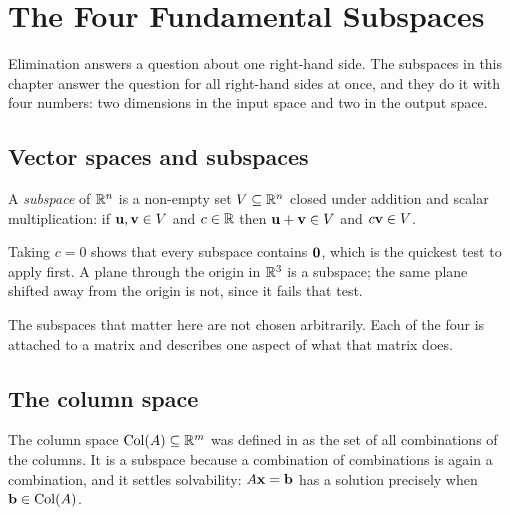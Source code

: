 \setchapterpreamble[u]{\margintoc}
\chapter{The Four Fundamental Subspaces}


Elimination answers a question about one right-hand side. The subspaces in this
chapter answer the question for all right-hand sides at once, and they do it
with four numbers: two dimensions in the input space and two in the output
space.

\section{Vector spaces and subspaces}

\begin{definition}
A \emph{subspace} of \(\mathbb{R}^{n}\) is a non-empty set \(V\subseteq\mathbb{R}^{n}\) closed
under addition and scalar multiplication: if \(\mathbf{u},\mathbf{v}\in V\) and
\(c\in\mathbb{R}\) then \(\mathbf{u}+\mathbf{v}\in V\) and \(c\mathbf{v}\in V\).
\end{definition}

Taking \(c=0\) shows that every subspace contains \(\mathbf{0}\), which is the
quickest test to apply first. A plane through the origin in \(\mathbb{R}^{3}\) is a
subspace; the same plane shifted away from the origin is not, since it fails
that test.


The subspaces that matter here are not chosen arbitrarily. Each of the four is
attached to a matrix and describes one aspect of what that matrix does.

\section{The column space}

The column space \(\operatorname{Col}(A)\subseteq\mathbb{R}^{m}\) was defined in
 as the set of all combinations of the columns.
It is a subspace because a combination of combinations is again a combination,
and it settles solvability: \(A\mathbf{x}=\mathbf{b}\) has a solution precisely when
\(\mathbf{b}\in\operatorname{Col}(A)\).

